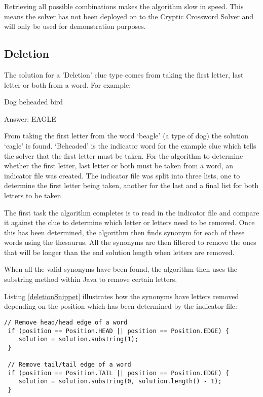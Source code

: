 Retrieving all possible combinations makes the algorithm slow in speed. This 
means the solver has not been deployed on to the Cryptic Crossword Solver 
and will only be used for demonstration purposes. 

\subsection{Deletion}

The solution for a 'Deletion' clue type comes from taking the first letter, 
last letter or both from a word. For example: 

Dog beheaded bird

Answer: EAGLE

From taking the first letter from the word `beagle' (a type of dog) the 
solution `eagle' is found. `Beheaded' is the indicator word for the example 
clue which tells the solver that the first letter must be taken. For the 
algorithm to determine whether the first letter, last letter or both must be 
taken from a word, an indicator file was created. The indicator file was 
split into three lists, one to determine the first letter being taken, another 
for the last and a final list for both letters to be taken. 

The first task the algorithm completes is to read in the indicator file and 
compare it against the clue to determine which letter or letters need to 
be removed. Once this has been determined, the algorithm then finds 
synonym for each of these words using the thesaurus. All the synonyms 
are then filtered to remove the ones that will be longer than the end 
solution length when letters are removed. 

When all the valid synonyms have been found, the algorithm then uses 
the substring method within Java to remove certain letters. 

Listing \ref{deletionSnippet} illustrates how the synonyms have letters 
removed depending on the position which has been determined by 
the indicator file: 

\begin{lstlisting}[caption={Removing letters from a word depending on the indicator},
                   label=deletionSnippet] 
 // Remove head/head edge of a word
 if (position == Position.HEAD || position == Position.EDGE) {
 	solution = solution.substring(1);
 }

 // Remove tail/tail edge of a word
 if (position == Position.TAIL || position == Position.EDGE) {
 	solution = solution.substring(0, solution.length() - 1);
 }
\end{lstlisting}

